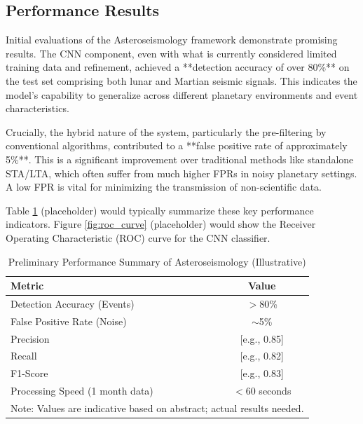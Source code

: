 \documentclass[conference]{IEEEtran}
\begin{document}
\subsection{Performance Results}
Initial evaluations of the Asteroseismology framework demonstrate promising results. The CNN component, even with what is currently considered limited training data and refinement, achieved a **detection accuracy of over 80\%** on the test set comprising both lunar and Martian seismic signals. This indicates the model's capability to generalize across different planetary environments and event characteristics.

Crucially, the hybrid nature of the system, particularly the pre-filtering by conventional algorithms, contributed to a **false positive rate of approximately 5\%**. This is a significant improvement over traditional methods like standalone STA/LTA, which often suffer from much higher FPRs in noisy planetary settings. A low FPR is vital for minimizing the transmission of non-scientific data.

Table \ref{tab:performance_summary} (placeholder) would typically summarize these key performance indicators. Figure \ref{fig:roc_curve} (placeholder) would show the Receiver Operating Characteristic (ROC) curve for the CNN classifier.

\begin{table}[htbp]
    \caption{Preliminary Performance Summary of Asteroseismology (Illustrative)}
    \begin{center}
        \begin{tabular}{|l|c|}
            \hline
            \textbf{Metric}                 & \textbf{Value} \\
            \hline
            Detection Accuracy (Events)     & $>$80\%        \\
            False Positive Rate (Noise)     & $\sim$5\%      \\
            Precision                       & [e.g., 0.85]   \\
            Recall                          & [e.g., 0.82]   \\
            F1-Score                        & [e.g., 0.83]   \\
            Processing Speed (1 month data) & $<$60 seconds  \\
            \hline
            \multicolumn{2}{l}{Note: Values are indicative based on abstract; actual results needed.}
        \end{tabular}
        \label{tab:performance_summary}
    \end{center}
\end{table}
\end{document}
